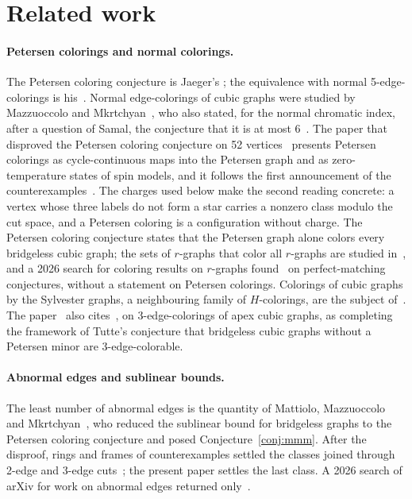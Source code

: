 \section{Related work}\label{sec:related}

\paragraph{Petersen colorings and normal colorings.} The Petersen coloring conjecture is Jaeger's
\cite{Jaeger1988}; the equivalence with normal 5-edge-colorings is his~\cite{Jaeger1985}. Normal
edge-colorings of cubic graphs were studied by Mazzuoccolo and Mkrtchyan~\cite{MM2020}, who also stated,
for the normal chromatic index, after a question of Samal, the conjecture that it is at most 6~\cite{MM2020b}. The paper that
disproved the Petersen coloring conjecture on 52 vertices~\cite{GJMMMU2026} presents Petersen colorings
as cycle-continuous maps into the Petersen graph and as zero-temperature states of spin models, and it
follows the first announcement of the counterexamples~\cite{GJMMM2026zen}. The charges used below make
the second reading concrete: a vertex whose three labels do not form a star carries a nonzero class
modulo the cut space, and a Petersen coloring is a configuration without charge. The Petersen coloring
conjecture states that the Petersen graph alone colors every bridgeless cubic graph; the sets of
$r$-graphs that color all $r$-graphs are studied in~\cite{MMSW2025}, and a 2026 search for coloring
results on $r$-graphs found~\cite{MSWZ2024} on perfect-matching conjectures, without a statement on
Petersen colorings. Colorings of cubic graphs by the Sylvester graphs, a neighbouring family of
$H$-colorings, are the subject of~\cite{Ferrarini2026}. The paper~\cite{GJMMMU2026} also cites~\cite{Inoue2026}, on 3-edge-colorings of apex cubic graphs, as
completing the framework of Tutte's conjecture that bridgeless cubic graphs without a Petersen minor are 3-edge-colorable.

\paragraph{Abnormal edges and sublinear bounds.} The least number of abnormal edges is the quantity of
Mattiolo, Mazzuoccolo and Mkrtchyan~\cite{MMM2021}, who reduced the sublinear bound for bridgeless
graphs to the Petersen coloring conjecture and posed Conjecture~\ref{conj:mmm}. After the
disproof, rings and frames of counterexamples settled the classes joined through 2-edge and 3-edge
cuts~\cite{Audit2026}; the present paper settles the last class. A 2026 search of arXiv for work on
abnormal edges returned only~\cite{MMM2021}.

